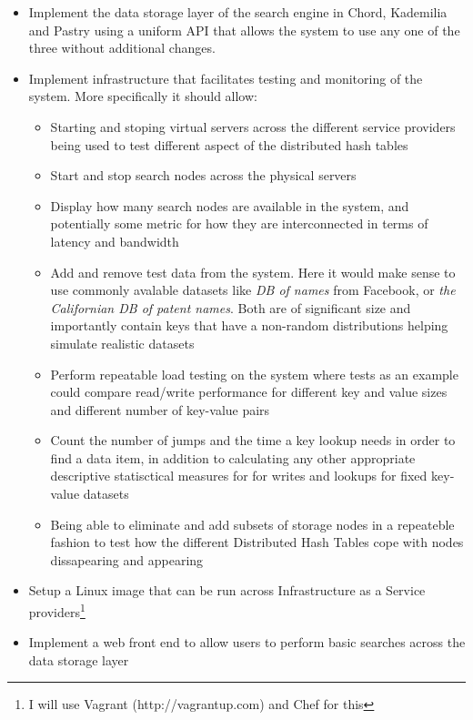 \begin{itemize}
  \item Implement the data storage layer of the search engine in Chord, Kademilia and Pastry using a uniform API that allows the system to use any one of the three without additional changes.
  
  \item Implement infrastructure that facilitates testing and monitoring of the system. More specifically it should allow:

  \begin{itemize}
    \item Starting and stoping virtual servers across the different service providers being used to test different aspect of the distributed hash tables
    \item Start and stop search nodes across the physical servers
    \item Display how many search nodes are available in the system, and potentially some metric for how they are interconnected in terms of latency and bandwidth
    \item Add and remove test data from the system. Here it would make sense to use commonly avalable datasets like \emph{DB of names} from Facebook, or \emph{the Californian DB of patent names}. Both are of significant size and importantly contain keys that have a non-random distributions helping simulate realistic datasets
    \item Perform repeatable load testing on the system where tests as an example could compare read/write performance for different key and value sizes and different number of key-value pairs
    \item Count the number of jumps and the time a key lookup needs in order to find a data item, in addition to calculating any other appropriate descriptive statisctical measures for for writes and lookups for fixed key-value datasets
    \item Being able to eliminate and add subsets of storage nodes in a repeateble fashion to test how the different Distributed Hash Tables cope with nodes dissapearing and appearing
  \end{itemize}

  \item Setup a Linux image that can be run across Infrastructure as a Service providers\footnote{I will use Vagrant (http://vagrantup.com) and Chef for this}

  \item Implement a web front end to allow users to perform basic searches across the data storage layer

\end{itemize}

